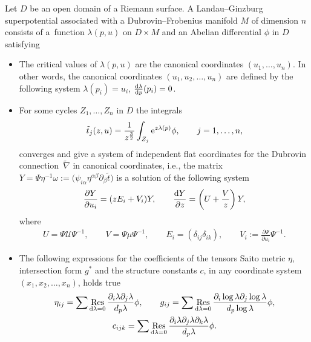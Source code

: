 \documentclass[pdftex]{sigma}
\numberwithin{equation}{section}
\DeclareMathOperator*{\res}{Res}
\begin{document}
\begin{Definition}\label{Landau--Ginzburg superpotential definition}
Let $D$ be an open domain of a Riemann surface. A Landau--Ginzburg superpotential associated with a Dubrovin--Frobenius manifold $M$ of dimension $n$ consists of a~function $\lambda(p,u)$ on $D \times M$ and an Abelian differential $\phi$ in $D$ satisfying
\begin{itemize}\itemsep=0pt
\item The critical values of $\lambda(p,u)$ are the canonical coordinates $(u_1,\dots,u_n)$. In other words, the canonical coordinates $(u_1,u_2,\dots ,u_n)$ are defined by the following system
$\lambda(p_i)=u_i$, $\frac{{\rm d} \lambda}{{\rm d}p}( p_i)=0$.
\item For some cycles $Z_1,\dots,Z_n$ in $D$ the integrals
\begin{gather}\label{Mirror symmetry}
\tilde t_j(z,u)=\frac{1}{z^{\frac{3}{2}}}\int_{Z_j}{\rm e}^{z\lambda(p)}\phi, \qquad j=1,\dots,n,
\end{gather}
converges and give a system of independent flat coordinates for the Dubrovin connection~$\tilde\nabla$ in canonical coordinates, i.e., the matrix
$Y=\Psi\eta^{-1}\omega:=\bigl(\psi_{i\alpha}\eta^{\alpha\beta}\partial_{\beta}\tilde t \bigr)$
is a solution of the following system
\begin{gather}\label{Dubrovin connection in canonical coordinates 1}
\frac{\partial Y}{\partial u_i}=( zE_i+V_i )Y,\qquad
\frac{{\rm d}Y}{\partial z}=\left( U+\frac{V}{z} \right)Y,
\end{gather}
where
\begin{gather}\label{U,V, Vi in canonical coordinates}
U=\Psi\mathcal{U}\Psi^{-1}, \qquad V=\Psi\mu\Psi^{-1}, \qquad E_i=( \delta_{ij}\delta_{ik} ), \qquad V_i:=\frac{\partial \Psi}{\partial u_i}\Psi^{-1}.
\end{gather}

\item
The following expressions for the coefficients of the tensors Saito metric $\eta$, intersection form $g^{*}$ and the structure constants $c$, in any coordinate system $(x_1,x_2,\dots,x_n)$, holds true
\begin{gather}
\eta_{ij}=\sum \res_{{\rm d}\lambda=0} \frac{ \partial_i\lambda \partial_j\lambda }{d_p\lambda }\phi, \qquad
g_{ij}=\sum \res_{{\rm d}\lambda=0} \frac{ \partial_i\log\lambda \partial_j\log\lambda }{d_p\log\lambda } \phi,\nonumber\\
c_{ijk}=\sum \res_{{\rm d}\lambda=0} \frac{ \partial_i\lambda \partial_j\lambda \partial_k\lambda }{d_p\lambda }\phi.\label{residue expression for eta, intersection form and structure constants}
\end{gather}
\end{itemize}
\end{Definition}
\end{document}
